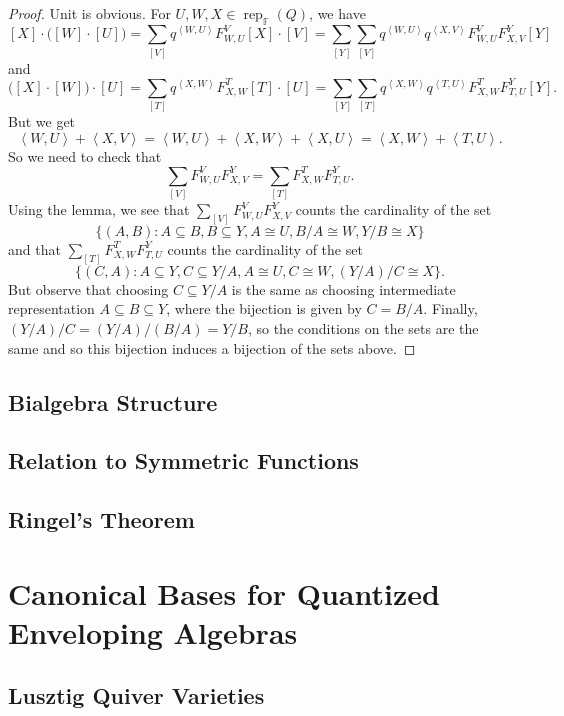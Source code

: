 \documentclass{book}
\DeclareMathOperator{\rep}{rep}
\begin{document}
    \begin{proof}
        Unit is obvious. For $U,W,X\in\rep_\mathbb{F}(Q)$, we have 
        \[[X]\cdot\Big([W]\cdot[U]\Big)=\sum_{[V]}q^{\left<W,U\right>}F_{W,U}^V[X]\cdot[V]=\sum_{[Y]}\sum_{[V]}q^{\left<W,U\right>}q^{\left<X,V\right>}F_{W,U}^VF_{X,V}^Y[Y]\]
        and
        \[ \Big([X]\cdot[W]\Big)\cdot[U] = \sum_{[T]}q^{\left<X,W\right>}F_{X,W}^T[T]\cdot[U] = \sum_{[Y]}\sum_{[T]}q^{\left<X,W\right>}q^{\left<T,U\right>}F_{X,W}^T F_{T,U}^Y[Y].\]
        But we get \[ \left<W,U\right>+\left<X,V\right> = \left<W,U\right>+\left<X,W\right>+\left<X,U\right> = \left<X,W\right>+\left<T,U\right>.\]
        So we need to check that \[\sum_{[V]}F_{W,U}^V F_{X,V}^Y=\sum_{[T]}F_{X,W}^T F_{T,U}^Y.\]
        Using the lemma, we see that $\sum_{[V]}F_{W,U}^V F_{X,V}^Y$ counts the cardinality of the set 
        \[\{(A,B): A\subseteq B, B\subseteq Y, A\cong U, B/A\cong W, Y/B\cong X\}\]
        and that $\sum_{[T]}F_{X,W}^T F_{T,U}^Y$ counts the cardinality of the set 
         \[\{(C,A): A\subseteq Y, C\subseteq Y/A, A\cong U, C\cong W, (Y/A)/C\cong X\}.\]
         But observe that choosing $C\subseteq Y/A$ is the same as choosing intermediate representation $A\subseteq B\subseteq Y$, where the bijection is given by $C=B/A$. Finally, $(Y/A)/C=(Y/A)/(B/A)=Y/B$, so the conditions on the sets are the same and so this bijection induces a bijection of the sets above.
    \end{proof}

  \section{Bialgebra Structure}

  \section{Relation to Symmetric Functions}

  \section{Ringel's Theorem}


\chapter{Canonical Bases for Quantized Enveloping Algebras}

  \section{Lusztig Quiver Varieties}
\end{document}
